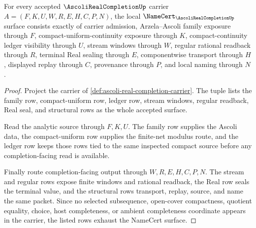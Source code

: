 \begin{theorem}
\label{thm:ascoli-real-completion-namecert-obligations}
For every accepted $\AscoliRealCompletionUp$ carrier $A=(F,K,U,W,R,E,H,C,P,N)$, the local $\NameCert_{\AscoliRealCompletionUp}$ surface consists exactly of carrier admission, Arzela--Ascoli family exposure through $F$, compact-uniform-continuity exposure through $K$, compact-continuity ledger visibility through $U$, stream windows through $W$, regular rational readback through $R$, terminal Real sealing through $E$, componentwise transport through $H$, displayed replay through $C$, provenance through $P$, and local naming through $N$.
\end{theorem}
\begin{proof}
Project the carrier of \autoref{def:ascoli-real-completion-carrier}. The tuple lists the family row, compact-uniform row, ledger row, stream windows, regular readback, Real seal, and structural rows as the whole accepted surface.

Read the analytic source through $F,K,U$. The family row supplies the Ascoli data, the compact-uniform row supplies the finite-net modulus route, and the ledger row keeps those rows tied to the same inspected compact source before any completion-facing read is available.

Finally route completion-facing output through $W,R,E,H,C,P,N$. The stream and regular rows expose finite windows and rational readback, the Real row seals the terminal value, and the structural rows transport, replay, source, and name the same packet. Since no selected subsequence, open-cover compactness, quotient equality, choice, host completeness, or ambient completeness coordinate appears in the carrier, the listed rows exhaust the NameCert surface.
\end{proof}

